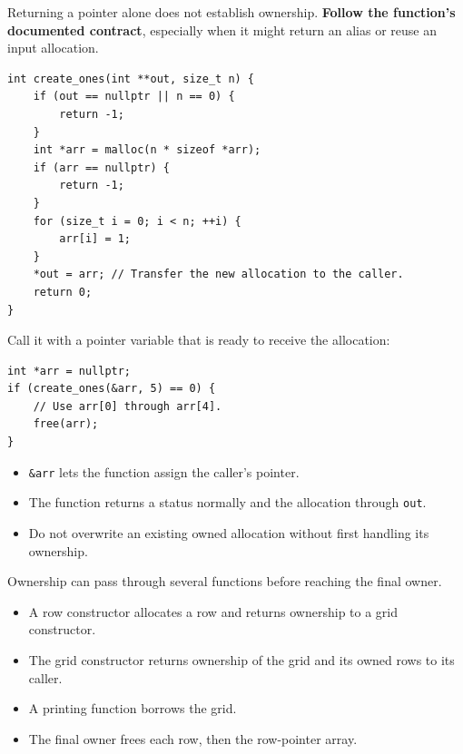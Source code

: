 \documentclass[11pt,a4paper]{article}
\providecommand{\tightlist}{\setlength{\itemsep}{0pt}\setlength{\parskip}{0pt}}
\begin{document}
Returning a pointer alone does not establish ownership. \textbf{Follow the function's documented contract}, especially when it might return an alias or reuse an input allocation.

\label{returning-an-allocation-through-int}
\hypertarget{returning-an-allocation-through-int}{}

\begin{lstlisting}[style=cscode]
int create_ones(int **out, size_t n) {
    if (out == nullptr || n == 0) {
        return -1;
    }
    int *arr = malloc(n * sizeof *arr);
    if (arr == nullptr) {
        return -1;
    }
    for (size_t i = 0; i < n; ++i) {
        arr[i] = 1;
    }
    *out = arr; // Transfer the new allocation to the caller.
    return 0;
}
\end{lstlisting}

Call it with a pointer variable that is ready to receive the allocation:

\begin{lstlisting}[style=cscode]
int *arr = nullptr;
if (create_ones(&arr, 5) == 0) {
    // Use arr[0] through arr[4].
    free(arr);
}
\end{lstlisting}

\begin{itemize}
\tightlist
\item
  \texttt{\&arr} lets the function assign the caller's pointer.
\item
  The function returns a status normally and the allocation through \texttt{out}.
\item
  Do not overwrite an existing owned allocation without first handling its ownership.
\end{itemize}

\label{l7.-recursion-ii}
\hypertarget{l7.-recursion-ii}{}

\label{ownership-across-multiple-functions}
\hypertarget{ownership-across-multiple-functions}{}

Ownership can pass through several functions before reaching the final owner.

\begin{itemize}
\tightlist
\item
  A row constructor allocates a row and returns ownership to a grid constructor.
\item
  The grid constructor returns ownership of the grid and its owned rows to its caller.
\item
  A printing function borrows the grid.
\item
  The final owner frees each row, then the row-pointer array.
\end{itemize}
\end{document}
